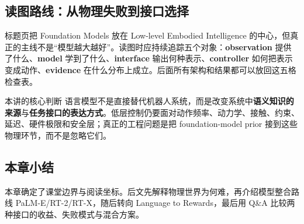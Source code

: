 \subsection{读图路线：从物理失败到接口选择}

标题页把 Foundation Models 放在 Low-level Embodied Intelligence 的中心，但真正的主线不是“模型越大越好”。读图时应持续追踪五个对象：\textbf{observation} 提供了什么、\textbf{model} 学到了什么、\textbf{interface} 输出何种表示、\textbf{controller} 如何把表示变成动作、\textbf{evidence} 在什么分布上成立。后面所有架构和结果都可以放回这五格检查表。


\begin{importantbox}{本讲的核心判断}
语言模型不是直接替代机器人系统，而是改变系统中\textbf{语义知识的来源}与\textbf{任务接口的表达方式}。低层控制仍要面对动作频率、动力学、接触、约束、延迟、硬件极限和安全层；真正的工程问题是把 foundation-model prior 接到这些物理环节，而不是忽略它们。
\end{importantbox}

\subsection{本章小结}

本章确定了课堂边界与阅读坐标。后文先解释物理世界为何难，再介绍模型整合路线 PaLM-E/RT-2/RT-X，随后转向 Language to Rewards，最后用 Q\&A 比较两种接口的收益、失败模式与混合方案。

